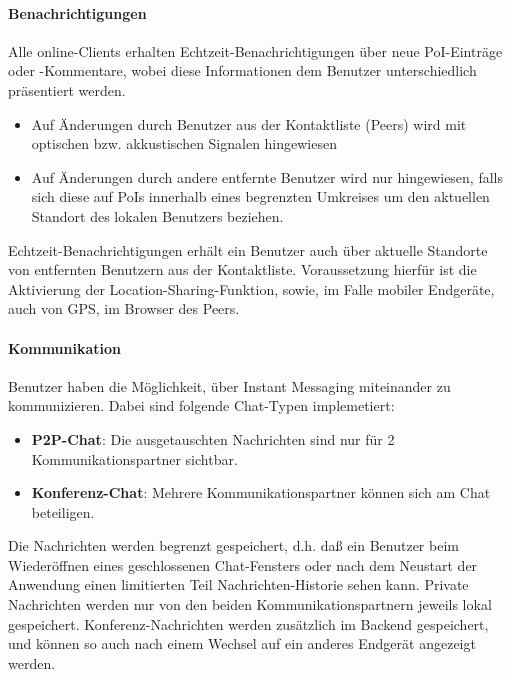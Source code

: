 \paragraph{Benachrichtigungen}
Alle online-Clients erhalten Echtzeit-Benachrichtigungen über neue PoI-Einträge oder -Kommentare, wobei diese Informationen dem Benutzer unterschiedlich präsentiert werden.
\begin{itemize}[leftmargin=*,noitemsep,topsep=1ex,parsep=0pt,partopsep=0pt]
\item Auf Änderungen durch Benutzer aus der Kontaktliste (Peers) wird mit optischen bzw. akkustischen Signalen hingewiesen
\item Auf Änderungen durch andere entfernte Benutzer wird nur hingewiesen, falls sich diese auf PoIs innerhalb eines begrenzten Umkreises um den aktuellen Standort des lokalen Benutzers beziehen.
\end{itemize}
Echtzeit-Benachrichtigungen erhält ein Benutzer auch über aktuelle Standorte von entfernten Benutzern aus der Kontaktliste. Voraussetzung hierfür ist die Aktivierung der Location-Sharing-Funktion, sowie, im Falle mobiler Endgeräte, auch von GPS, im Browser des Peers.%

\paragraph{Kommunikation}
Benutzer haben die Möglichkeit, über Instant Messaging miteinander zu kommunizieren. Dabei sind
folgende Chat-Typen implemetiert:
\begin{itemize}[leftmargin=*,noitemsep,topsep=1ex,parsep=0pt,partopsep=0pt]
\item \textbf{P2P-Chat}: Die ausgetauschten Nachrichten sind nur für 2 Kommunikationspartner sichtbar.
\item \textbf{Konferenz-Chat}: Mehrere Kommunikationspartner können sich am Chat beteiligen.
\end{itemize}
Die Nachrichten werden begrenzt gespeichert, d.h. daß ein Benutzer beim Wiederöffnen eines  geschlossenen Chat-Fensters oder nach dem Neustart der Anwendung einen limitierten Teil Nachrichten-Historie sehen kann.
Private Nachrichten werden nur von den beiden Kommunikationspartnern jeweils lokal gespeichert. Konferenz-Nachrichten werden zusätzlich im Backend gespeichert, und können so auch nach einem Wechsel auf ein anderes Endgerät angezeigt werden.

